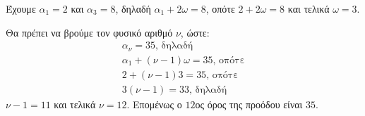 
\begin{alist}
\item Έχουμε $\alpha_1 = 2$ και $\alpha_3 = 8$, δηλαδή
$\alpha_1 + 2\omega = 8$, οπότε
$2 + 2\omega = 8$ και τελικά $\omega = 3$.

\item Θα πρέπει να βρούμε τον φυσικό αριθμό $\nu$, ώστε:
\begin{gather*}
\alpha_\nu = 35\text{, δηλαδή} \\
\alpha_1 + (\nu - 1)\omega = 35\text{, οπότε} \\
2 + (\nu - 1)3 = 35\text{, οπότε} \\
3(\nu - 1) = 33\text{, δηλαδή}
\end{gather*}
$\nu - 1 = 11$ και τελικά $\nu = 12$.
Επομένως ο $12$ος όρος της προόδου είναι $35$.
\end{alist}

